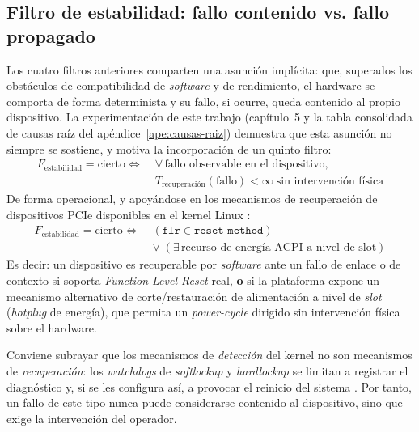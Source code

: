 \subsection{Filtro de estabilidad: fallo contenido vs. fallo propagado}
\label{sec:estabilidad}

Los cuatro filtros anteriores comparten una asunción implícita: que, superados los obstáculos de compatibilidad de \textit{software} y de rendimiento, el hardware se comporta de forma determinista y su fallo, si ocurre, queda contenido al propio dispositivo. La experimentación de este trabajo (capítulo~5 y la tabla consolidada de causas raíz del apéndice~\ref{ape:causas-raiz}) demuestra que esta asunción no siempre se sostiene, y motiva la incorporación de un quinto filtro:
\begin{equation}
\begin{split}
F_{\text{estabilidad}} = \text{cierto} \iff \;& \forall\, \text{fallo observable en el dispositivo},\\[-2pt]
& T_{\text{recuperación}}(\text{fallo}) < \infty \; \text{sin intervención física}
\end{split}
\end{equation}
De forma operacional, y apoyándose en los mecanismos de recuperación de dispositivos PCIe disponibles en el kernel Linux \cite{kernel_vfio}:
\begin{equation}
\begin{split}
F_{\text{estabilidad}} = \text{cierto} \iff \;& (\texttt{flr} \in \texttt{reset\_method})\\
& \lor\; (\exists\, \text{recurso de energía ACPI a nivel de slot})
\end{split}
\end{equation}
Es decir: un dispositivo es recuperable por \textit{software} ante un fallo de enlace o de contexto si soporta \textit{Function Level Reset} real, \textbf{o} si la plataforma expone un mecanismo alternativo de corte/restauración de alimentación a nivel de \textit{slot} (\textit{hotplug} de energía), que permita un \textit{power-cycle} dirigido sin intervención física sobre el hardware.

Conviene subrayar que los mecanismos de \emph{detección} del kernel no son mecanismos de \emph{recuperación}: los \textit{watchdogs} de \textit{softlockup} y \textit{hardlockup} se limitan a registrar el diagnóstico y, si se les configura así, a provocar el reinicio del sistema \cite{kernel_lockup_watchdog}. Por tanto, un fallo de este tipo nunca puede considerarse contenido al dispositivo, sino que exige la intervención del operador.

